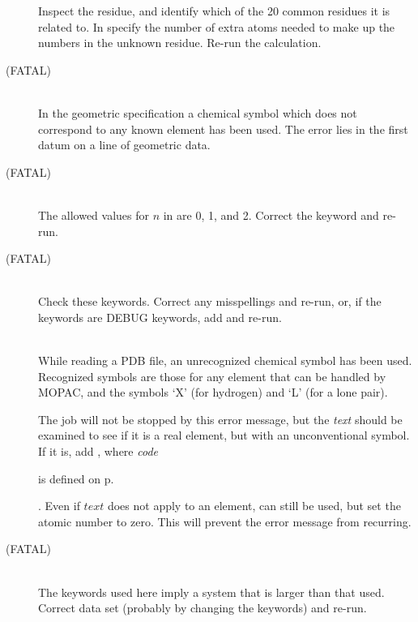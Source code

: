 \begin{description}
Inspect the residue, and identify which of the 20 common residues it is related
to.  In  specify the number of extra atoms needed to make up the numbers
in the unknown residue.  Re-run the calculation.

\item[\comp{UNRECOGNIZED ELEMENT NAME} (FATAL)]~\\
In the geometric specification a chemical  symbol  which  does  not correspond 
to  any  known element has been used.  The error lies in the first datum on a
line of geometric data.

\item[\comp{UNRECOGNIZED HESS OPTION} (FATAL)]~\\
The allowed values for $n$ in  are 0, 1, and 2. Correct the
keyword and re-run.

\item[\comp{UNRECOGNIZED KEY-WORDS.} (FATAL)]~\\
Check these keywords.  Correct any misspellings and re-run, or, if the
keywords are DEBUG keywords, add  and re-run.

\item[\comp{UNRECOGNIZED SPECIES: \textit{text}}]~\\
While reading a PDB file, an unrecognized chemical symbol has been used.
Recognized symbols are those for any element that can be handled by MOPAC,
and the symbols `X' (for hydrogen) and `L' (for a lone pair).

The job will not be stopped by this error message, but the
\textit{text} should be examined to see if it is a real element, but
with an unconventional symbol.  If it is, add
, where \textit{code} 
\begin{htmlonly}
\end{htmlonly}
\begin{latexonly}
is defined on p.~\pageref{key_pdb}
\end{latexonly}.  Even if $text$ does
not apply to an element,  can still be used, but set
the atomic number to zero.  This will prevent the error message from
recurring.

\item[\comp{UPPER BOUND OF ACTIVE SPACE IS GREATER THAN THE NUMBER OF ORBITALS} (FATAL)]~\\
The keywords used here imply a system that is larger than that used.
Correct data set (probably by changing the keywords) and re-run.


\end{description}
